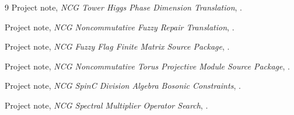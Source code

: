 \documentclass[11pt]{article}
\begin{document}
\begin{thebibliography}{9}
Project note, \emph{NCG Tower Higgs Phase Dimension Translation},
.

Project note, \emph{NCG Noncommutative Fuzzy Repair Translation},
.

Project note, \emph{NCG Fuzzy Flag Finite Matrix Source Package},
.

Project note, \emph{NCG Noncommutative Torus Projective Module Source Package},
.

Project note, \emph{NCG SpinC Division Algebra Bosonic Constraints},
.

Project note, \emph{NCG Spectral Multiplier Operator Search},
.

\end{thebibliography}
\end{document}
